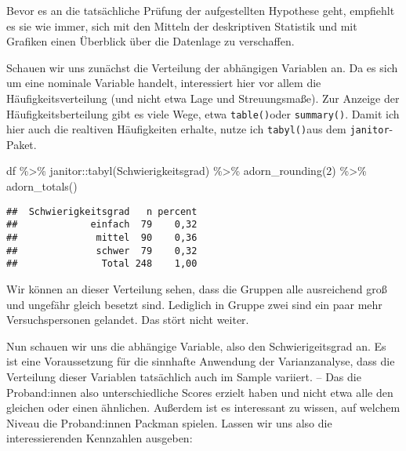 \documentclass[
]{book}
\newenvironment{Shaded}{\begin{snugshade}}{\end{snugshade}}
\newcommand{\DecValTok}[1]{\textcolor[rgb]{0.00,0.00,0.81}{#1}}
\newcommand{\FunctionTok}[1]{\textcolor[rgb]{0.00,0.00,0.00}{#1}}
\newcommand{\NormalTok}[1]{#1}
\newcommand{\SpecialCharTok}[1]{\textcolor[rgb]{0.00,0.00,0.00}{#1}}
\begin{document}
Bevor es an die tatsächliche Prüfung der aufgestellten Hypothese geht, empfiehlt es sie wie immer, sich mit den Mitteln der deskriptiven Statistik und mit Grafiken einen Überblick über die Datenlage zu verschaffen.

Schauen wir uns zunächst die Verteilung der abhängigen Variablen an. Da es sich um eine nominale Variable handelt, interessiert hier vor allem die Häufigkeitsverteilung (und nicht etwa Lage und Streuungsmaße). Zur Anzeige der Häufigkeitsberteilung gibt es viele Wege, etwa \texttt{table()}oder \texttt{summary()}. Damit ich hier auch die realtiven Häufigkeiten erhalte, nutze ich \texttt{tabyl()}aus dem \texttt{janitor}-Paket.

\begin{Shaded}
\begin{Highlighting}[]
\NormalTok{df }\SpecialCharTok{\%\textgreater{}\%} 
\NormalTok{  janitor}\SpecialCharTok{::}\FunctionTok{tabyl}\NormalTok{(Schwierigkeitsgrad) }\SpecialCharTok{\%\textgreater{}\%} 
  \FunctionTok{adorn\_rounding}\NormalTok{(}\DecValTok{2}\NormalTok{) }\SpecialCharTok{\%\textgreater{}\%} 
  \FunctionTok{adorn\_totals}\NormalTok{() }
\end{Highlighting}
\end{Shaded}

\begin{verbatim}
##  Schwierigkeitsgrad   n percent
##             einfach  79    0,32
##              mittel  90    0,36
##              schwer  79    0,32
##               Total 248    1,00
\end{verbatim}

Wir können an dieser Verteilung sehen, dass die Gruppen alle ausreichend groß und ungefähr gleich besetzt sind. Lediglich in Gruppe zwei sind ein paar mehr Versuchspersonen gelandet. Das stört nicht weiter.

Nun schauen wir uns die abhängige Variable, also den Schwierigeitsgrad an. Es ist eine Voraussetzung für die sinnhafte Anwendung der Varianzanalyse, dass die Verteilung dieser Variablen tatsächlich auch im Sample variiert. -- Das die Proband:innen also unterschiedliche Scores erzielt haben und nicht etwa alle den gleichen oder einen ähnlichen. Außerdem ist es interessant zu wissen, auf welchem Niveau die Proband:innen Packman spielen. Lassen wir uns also die interessierenden Kennzahlen ausgeben:

\begin{Shaded}
\end{Shaded}
\end{document}
